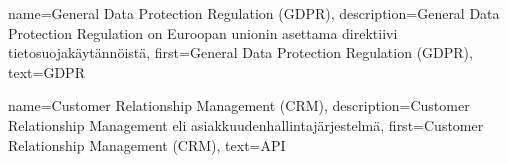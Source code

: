 %
%
%

\makeglossaries




    {
        name={General Data Protection Regulation (GDPR)},
	description={General Data Protection Regulation on Euroopan unionin asettama direktiivi tietosuojakäytännöistä},
	first={General Data Protection Regulation (GDPR)},
	text={GDPR}
    }

    {
	name={Customer Relationship Management (CRM)},
	description={Customer Relationship Management eli asiakkuudenhallintajärjestelmä},
	first={Customer Relationship Management (CRM)},
	text={API}
    }

